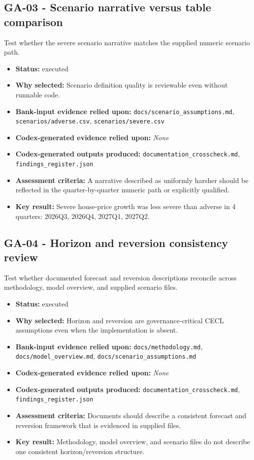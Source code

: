 \documentclass[11pt]{article}
\begin{document}
\subsection*{GA-03 - Scenario narrative versus table comparison}
Test whether the severe scenario narrative matches the supplied numeric scenario path.
\begin{itemize}
\item \textbf{Status:} executed
\item \textbf{Why selected:} Scenario definition quality is reviewable even without runnable code.
\item \textbf{Bank-input evidence relied upon:} \texttt{docs/scenario\_assumptions.md}, \texttt{scenarios/adverse.csv}, \texttt{scenarios/severe.csv}
\item \textbf{Codex-generated evidence relied upon:} \textit{None}
\item \textbf{Codex-generated outputs produced:} \texttt{documentation\_crosscheck.md}, \texttt{findings\_register.json}
\item \textbf{Assessment criteria:} A narrative described as uniformly harsher should be reflected in the quarter-by-quarter numeric path or explicitly qualified.
\item \textbf{Key result:} Severe house-price growth was less severe than adverse in 4 quarters: 2026Q3, 2026Q4, 2027Q1, 2027Q2.
\end{itemize}
\subsection*{GA-04 - Horizon and reversion consistency review}
Test whether documented forecast and reversion descriptions reconcile across methodology, model overview, and supplied scenario files.
\begin{itemize}
\item \textbf{Status:} executed
\item \textbf{Why selected:} Horizon and reversion are governance-critical CECL assumptions even when the implementation is absent.
\item \textbf{Bank-input evidence relied upon:} \texttt{docs/methodology.md}, \texttt{docs/model\_overview.md}, \texttt{docs/scenario\_assumptions.md}
\item \textbf{Codex-generated evidence relied upon:} \textit{None}
\item \textbf{Codex-generated outputs produced:} \texttt{documentation\_crosscheck.md}, \texttt{findings\_register.json}
\item \textbf{Assessment criteria:} Documents should describe a consistent forecast and reversion framework that is evidenced in supplied files.
\item \textbf{Key result:} Methodology, model overview, and scenario files do not describe one consistent horizon/reversion structure.
\end{itemize}
\end{document}
